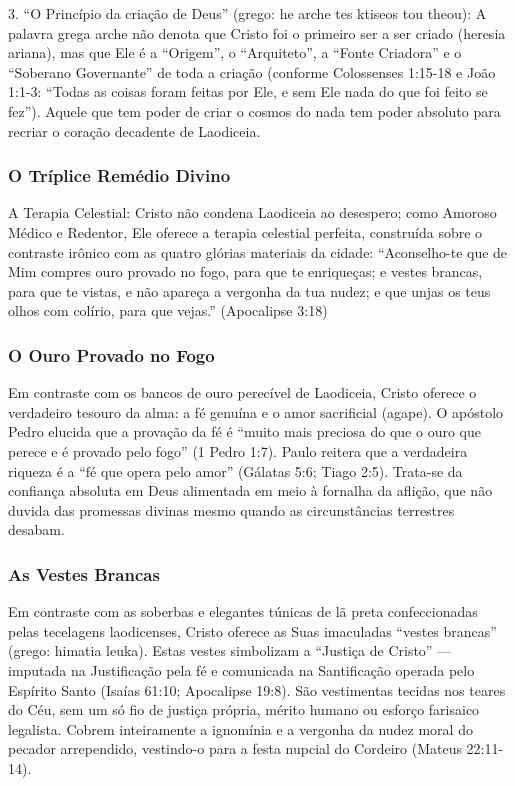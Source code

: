 \documentclass[11pt,a4paper,openany]{book}
\begin{document}
3. ``O Princípio da criação de Deus'' (grego: he arche tes ktiseos tou theou): A palavra grega arche não denota que Cristo foi o primeiro ser a ser criado (heresia ariana), mas que Ele é a ``Origem'', o ``Arquiteto'', a ``Fonte Criadora'' e o ``Soberano Governante'' de toda a criação (conforme Colossenses 1:15-18 e João 1:1-3: ``Todas as coisas foram feitas por Ele, e sem Ele nada do que foi feito se fez''). Aquele que tem poder de criar o cosmos do nada tem poder absoluto para recriar o coração decadente de Laodiceia.


\subsubsection*{O Tríplice Remédio Divino}
A Terapia Celestial:
Cristo não condena Laodiceia ao desespero; como Amoroso Médico e Redentor, Ele oferece a terapia celestial perfeita, construída sobre o contraste irônico com as quatro glórias materiais da cidade:
``Aconselho-te que de Mim compres ouro provado no fogo, para que te enriqueças; e vestes brancas, para que te vistas, e não apareça a vergonha da tua nudez; e que unjas os teus olhos com colírio, para que vejas.'' (Apocalipse 3:18)


\subsubsection*{O Ouro Provado no Fogo}
Em contraste com os bancos de ouro perecível de Laodiceia, Cristo oferece o verdadeiro tesouro da alma: a fé genuína e o amor sacrificial (agape). O apóstolo Pedro elucida que a provação da fé é ``muito mais preciosa do que o ouro que perece e é provado pelo fogo'' (1 Pedro 1:7). Paulo reitera que a verdadeira riqueza é a ``fé que opera pelo amor'' (Gálatas 5:6; Tiago 2:5). Trata-se da confiança absoluta em Deus alimentada em meio à fornalha da aflição, que não duvida das promessas divinas mesmo quando as circunstâncias terrestres desabam.


\subsubsection*{As Vestes Brancas}
Em contraste com as soberbas e elegantes túnicas de lã preta confeccionadas pelas tecelagens laodicenses, Cristo oferece as Suas imaculadas ``vestes brancas'' (grego: himatia leuka). Estas vestes simbolizam a ``Justiça de Cristo'' — imputada na Justificação pela fé e comunicada na Santificação operada pelo Espírito Santo (Isaías 61:10; Apocalipse 19:8). São vestimentas tecidas nos teares do Céu, sem um só fio de justiça própria, mérito humano ou esforço farisaico legalista. Cobrem inteiramente a ignomínia e a vergonha da nudez moral do pecador arrependido, vestindo-o para a festa nupcial do Cordeiro (Mateus 22:11-14).
\end{document}
